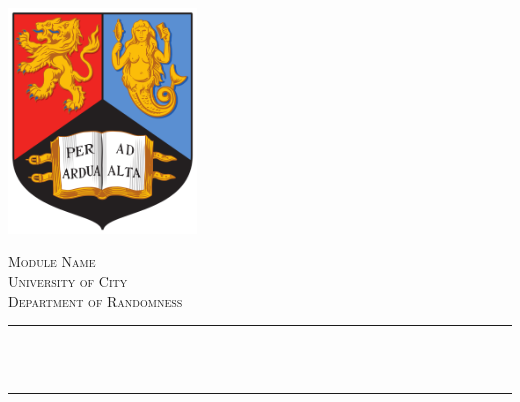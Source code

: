 \begin{titlepage}

    \newcommand{\HRule}{\rule{\linewidth}{0.5mm}} %
    
    \center
    \includegraphics[width=5cm]{Title/UoB.png}\\[1cm] %
     
    
    \center %
    
    
    \textsc{\LARGE Module Name }\\[1.5cm] %
    \textsc{\Large University of City}\\[0.5cm] %
    \textsc{\large Department of Randomness}\\[0.5cm] %
    
    \makeatletter
    \HRule \\[0.4cm]
    { \huge \bfseries \@title}\\[0.4cm] %
    \HRule \\[1.5cm]
     

\end{titlepage}
